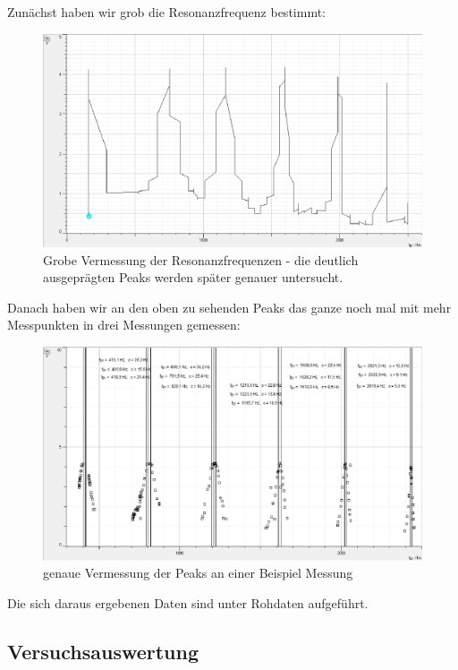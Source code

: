 \documentclass[12pt,a4paper]{article}
\begin{document}
Zunächst haben wir grob die Resonanzfrequenz bestimmt:
\begin{figure}[H]
\centering
\includegraphics[scale=0.5]{Bilder/grobevermessung.png}
\caption{Grobe Vermessung der Resonanzfrequenzen - die deutlich ausgeprägten Peaks werden später genauer untersucht.}
\end{figure}
Danach haben wir an den oben zu sehenden Peaks das ganze noch mal mit mehr Messpunkten in drei Messungen gemessen:
\begin{figure}[H]
\centering
\includegraphics[scale=0.5]{Bilder/vermessung_variation_genau.png}
\caption{genaue Vermessung der Peaks an einer Beispiel Messung}
\end{figure}
Die sich daraus ergebenen Daten sind unter Rohdaten aufgeführt.
\subsection{Versuchsauswertung}
\end{document}
